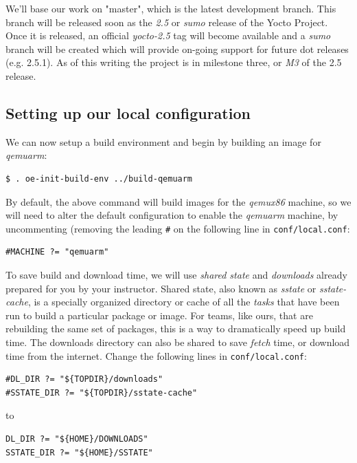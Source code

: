 \documentclass[a4paper,12pt,obeyspaces,spaces,hyphens]{article}
\begin{document}
We'll base our work on "master", which is the latest development branch. This branch will be released soon as the {\em 2.5} or {\em sumo} release of the Yocto Project. Once it is released, an official {\em yocto-2.5} tag will become available and a {\em sumo} branch will be created which will provide on-going support for future dot releases (e.g. 2.5.1). As of this writing the project is in milestone three, or {\em M3} of the 2.5 release. 

\subsection{Setting up our local configuration}

We can now setup a build environment and begin by building an image for {\em qemuarm}:

\begin{verbatim}
$ . oe-init-build-env ../build-qemuarm
\end{verbatim}

By default, the above command will build images for the {\em qemux86} machine, so we will need to alter the default configuration to enable the {\em qemuarm} machine, by uncommenting (removing the leading \texttt{\#} on the following line in \texttt{conf/local.conf}:

\begin{verbatim}
#MACHINE ?= "qemuarm"
\end{verbatim}

To save build and download time, we will use {\em shared state} and {\em downloads} already prepared for you by your instructor. Shared state, also known as {\em sstate} or {\em sstate-cache}, is a specially organized directory or cache of all the {\em tasks} that have been run to build a particular package or image. For teams, like ours, that are rebuilding the same set of packages, this is a way to dramatically speed up build time. The downloads directory can also be shared to save {\em fetch} time, or download time from the internet. Change the following lines in \texttt{conf/local.conf}:

\begin{verbatim}
#DL_DIR ?= "${TOPDIR}/downloads"
#SSTATE_DIR ?= "${TOPDIR}/sstate-cache"
\end{verbatim}

to

\begin{verbatim}
DL_DIR ?= "${HOME}/DOWNLOADS"
SSTATE_DIR ?= "${HOME}/SSTATE"
\end{verbatim}
\end{document}
